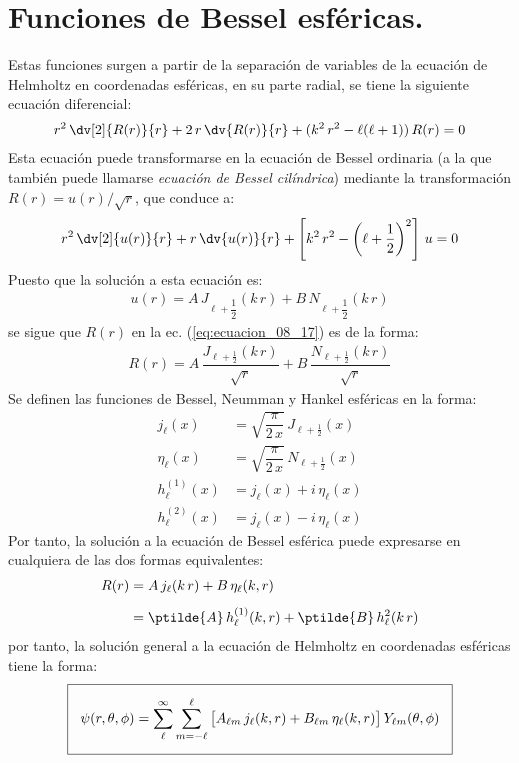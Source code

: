 \section{Funciones de Bessel esféricas.}
Estas funciones surgen a partir de la separación de variables de la ecuación de Helmholtz en coordenadas esféricas, en su parte radial, se tiene la siguiente ecuación diferencial:
\begin{align}
r^{2} \, \dv[2]{R(r)}{r} + 2 \, r \, \dv{R(r)}{r} + (k^{2} \, r^{2} - \ell (\ell + 1)) \, R(r) = 0
\label{eq:ecuacion_08_17}
\end{align}
Esta ecuación puede transformarse en la ecuación de Bessel ordinaria (a la que también puede llamarse \emph{ecuación de Bessel cilíndrica}) mediante la transformación $R(r) = u(r) /\sqrt{r}$, que conduce a:
\begin{align*}
r^{2} \, \dv[2]{u(r)}{r} + r \, \dv{u(r)}{r} + \left[ k^{2} \, r^{2} -  \left( \ell + \dfrac{1}{2} \right)^{2} \right] \, u = 0
\end{align*}
Puesto que la solución a esta ecuación es:
\begin{align*}
u(r) = A \, J_{\ell+\dfrac{1}{2}} (k \, r) + B \, N_{\ell+\dfrac{1}{2}} (k \, r)
\end{align*}
se sigue que $R(r)$ en la ec. (\ref{eq:ecuacion_08_17}) es de la forma:
\begin{align*}
R(r) = A \, \dfrac{J_{\ell+\frac{1}{2}} (k \, r)}{\sqrt{r}} + B \, \dfrac{N_{\ell+\frac{1}{2}} (k \, r)}{\sqrt{r}}  \end{align*}
Se definen las funciones de Bessel, Neumman y Hankel esféricas en la forma:
\begin{align*}
j_{\ell} (x) &= \sqrt{\dfrac{\pi}{2 \, x}} \, J_{\ell+\frac{1}{2}} (x) \\[0.5em]
\eta_{\ell} (x) &= \sqrt{\dfrac{\pi}{2 \, x}} \, N_{\ell+\frac{1}{2}} (x) \\[0.5em]
h_{\ell}^{(1)} (x) &= j_{\ell} (x) + i \, \eta_{\ell} (x) \\[0.5em]
h_{\ell}^{(2)} (x) &= j_{\ell} (x) - i \, \eta_{\ell} (x)
\end{align*}
Por tanto, la solución a la ecuación de Bessel esférica puede expresarse en cualquiera de las dos formas equivalentes:
\begin{align}
\begin{aligned}
R(r) &= A \, j_{\ell} (k \, r) +  B \, \eta_{\ell} (k , r) \\[0.5em]
&= \ptilde{A} \, h_{\ell}^{(1)} (k , r) + \ptilde{B} \, h_{\ell}^{2} (k \, r)
\end{aligned}
\label{eq:ecuacion_08_18}
\end{align}
por tanto, la solución general a la ecuación de Helmholtz en coordenadas esféricas tiene la forma:
\begin{align*}
\setlength{\fboxsep}{3\fboxsep}\boxed{
\psi (r, \theta, \phi) = \sum_{\ell}^{\infty} \sum_{m=-\ell}^{\ell} \big[ A_{\ell m} \, j_{\ell} (k , r) + B_{\ell m} \, \eta_{\ell} (k , r) \big] \, Y_{\ell m} (\theta, \phi)}
\end{align*}
